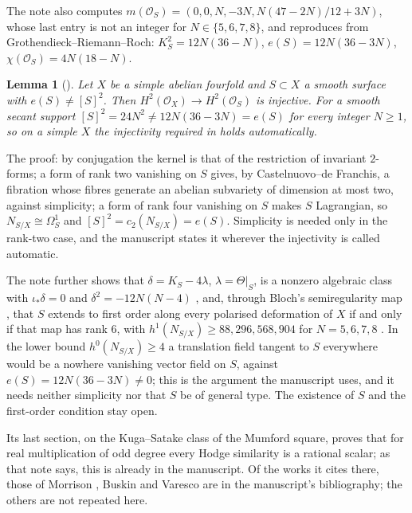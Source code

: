\documentclass[11pt]{amsart}
\newtheorem{lemma}[theorem]{Lemma}
\theoremstyle{definition}
\theoremstyle{remark}
\newcommand{\cO}{\mathcal{O}}
\begin{document}
The note also computes $m(\cO_{S})=(0,0,N,-3N,N(47-2N)/12+3N)$, whose last
entry is not an integer for $N\in\{5,6,7,8\}$, and reproduces
\cite[Table~3]{BMB} from Grothendieck--Riemann--Roch: $K_{S}^{2}=12N(36-N)$,
$e(S)=12N(36-3N)$, $\chi(\cO_{S})=4N(18-N)$.

\begin{lemma}[{\cite[Lemma~18.43]{BMB}}]\label{lem:inj}
Let $X$ be a simple abelian fourfold and $S\subset X$ a smooth surface with
$e(S)\neq[S]^{2}$. Then $H^{2}(\cO_{X})\to H^{2}(\cO_{S})$ is injective. For a
smooth secant support $[S]^{2}=24N^{2}\neq12N(36-3N)=e(S)$ for every integer
$N\ge1$, so on a simple $X$ the injectivity required in
\cite[Corollary~18.68(ii)]{BMB} holds automatically.
\end{lemma}

The proof: by conjugation the kernel is that of the restriction of invariant
$2$-forms; a form of rank two vanishing on $S$ gives, by Castelnuovo--de
Franchis, a fibration whose fibres generate an abelian subvariety of
dimension at most two, against simplicity; a form of rank four vanishing on
$S$ makes $S$ Lagrangian, so $N_{S/X}\cong\Omega^{1}_{S}$ and
$[S]^{2}=c_{2}(N_{S/X})=e(S)$. Simplicity is needed only in the rank-two
case, and the manuscript states it wherever the injectivity is called
automatic.

The note further shows that $\delta=K_{S}-4\lambda$, $\lambda=\Theta|_{S}$, is
a nonzero algebraic class with $\iota_{*}\delta=0$ and
$\delta^{2}=-12N(N-4)$ \cite[Remark~18.44]{BMB}, and, through Bloch's
semiregularity map \cite{Blo72}, that $S$ extends to first order along every
polarised deformation of $X$ if and only if that map has rank $6$, with
$h^{1}(N_{S/X})\ge88,296,568,904$ for $N=5,6,7,8$
\cite[Proposition~18.46]{BMB}. In the lower bound $h^{0}(N_{S/X})\ge4$ a
translation field tangent to $S$ everywhere would be a nowhere vanishing
vector field on $S$, against $e(S)=12N(36-3N)\ne0$; this is the argument the
manuscript uses, and it needs neither simplicity nor that $S$ be of general
type. The existence of $S$ and the first-order condition stay open.

Its last section, on the Kuga--Satake class of the Mumford square, proves
that for real multiplication of odd degree every Hodge similarity is a
rational scalar; as that note says, this is already in the manuscript. Of the
works it cites there, those of Morrison \cite{Mor84}, Buskin \cite{Bus19} and
Varesco \cite{Var23} are in the manuscript's bibliography; the others are not
repeated here.
\end{document}
